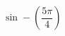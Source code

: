 \begin{ex}[type=calculate]
	\begin{condition}
		\( \sin-\left( \dfrac{5\pi}{4} \right) \)
	\end{condition}
\end{ex}